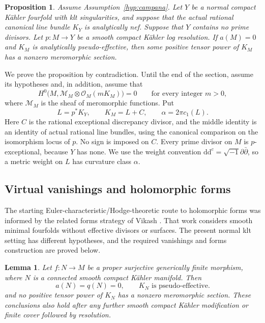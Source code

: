 \documentclass[11pt,letterpaper]{article}
\newtheorem{proposition}[theorem]{Proposition}
\newtheorem{lemma}[theorem]{Lemma}
\theoremstyle{definition}
\theoremstyle{remark}
\begin{document}
\begin{proposition}\label{fol:empty-case}
Assume Assumption~\ref{hyp:campana}.  Let $Y$ be a normal compact K\"ahler
fourfold with klt singularities, and suppose that the actual rational
canonical line bundle $K_Y$ is analytically nef.  Suppose that $Y$ contains
no prime divisors.  Let $p\colon M\to Y$ be a smooth compact K\"ahler log
resolution.  If $a(M)=0$ and $K_M$ is analytically pseudo-effective, then
some positive tensor power of $K_M$ has a nonzero meromorphic section.
\end{proposition}

We prove the proposition by contradiction.  Until the end of the section,
assume its hypotheses and, in addition, assume that
\begin{equation}\label{fol:no-meromorphic}
 H^0\bigl(M,\mathcal M_M\otimes\mathcal{O}_M(mK_M)\bigr)=0
 \qquad\text{for every integer }m>0,
\end{equation}
where $\mathcal M_M$ is the sheaf of meromorphic functions.  Put
\begin{equation}\label{fol:canonical-comparison}
 L=p^*K_Y,\qquad K_M=L+C,\qquad \alpha=2\pi c_1(L).
\end{equation}
Here $C$ is the rational exceptional discrepancy divisor, and the middle
identity is an identity of actual rational line bundles, using the
canonical comparison on the isomorphism locus of $p$.  No sign is imposed
on $C$.  Every prime divisor on $M$ is $p$-exceptional, because $Y$ has
none.  We use the weight convention $\mathrm{d}\mathrm{d}^{c}=\sqrt{-1}\partial\bar\partial$, so a
metric weight on $L$ has curvature class $\alpha$.

\subsection{Virtual vanishings and holomorphic forms}

The starting Euler-characteristic/Hodge-theoretic route to holomorphic
forms was informed by the related forms strategy of Vikash \cite{Vikash2026}.
That work considers smooth minimal fourfolds without effective divisors
or surfaces.  The present normal klt setting has different hypotheses,
and the required vanishings and forms construction are proved below.

\begin{lemma}\label{fol:virtual-vanishing}
Let $f\colon N\to M$ be a proper surjective generically finite morphism,
where $N$ is a connected smooth compact K\"ahler manifold.  Then
\begin{equation}\label{fol:virtual-data}
 a(N)=q(N)=0,\qquad K_N\text{ is pseudo-effective}.
\end{equation}
and no positive tensor power of $K_N$ has a nonzero meromorphic section.
These conclusions also hold after any further smooth compact K\"ahler
modification or finite cover followed by resolution.
\end{lemma}
\end{document}
